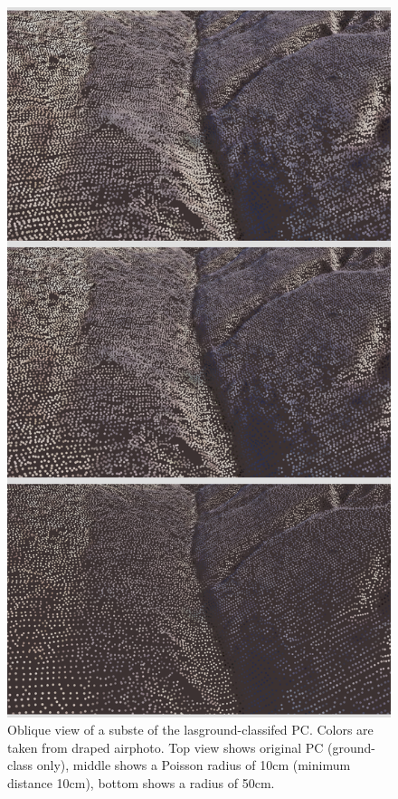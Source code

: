 \documentclass[a4paperpaper,,tablecaptionabove]{scrartcl}
\begin{document}
\begin{figure}
\centering
\includegraphics[width=\textwidth,height=0.9\textheight]{./tex2pdf.-e6884bf2dada0f3b/b7ead71189eb3082d8e107a64c92e4729469e718.png}
\caption{Oblique view of a subste of the lasground-classifed PC. Colors
are taken from draped airphoto. Top view shows original PC (ground-class
only), middle shows a Poisson radius of 10cm (minimum distance 10cm),
bottom shows a radius of 50cm.
\label{Fig:Cat16_PC_zoom_poisson_sampling}}
\end{figure}
\end{document}
